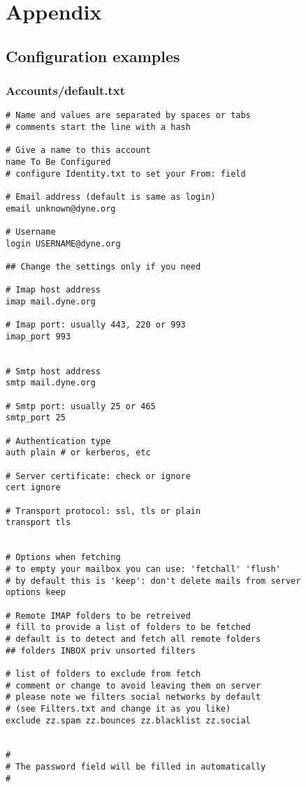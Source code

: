 \documentclass[a4,onecolumn,portrait]{article}
\begin{document}
\section{Appendix}
\label{sec-13}

\subsection{Configuration examples}
\label{sec-13-1}

\subsubsection{Accounts/default.txt}
\label{sec-13-1-1}

\begin{verbatim}
# Name and values are separated by spaces or tabs
# comments start the line with a hash

# Give a name to this account
name To Be Configured
# configure Identity.txt to set your From: field

# Email address (default is same as login)
email unknown@dyne.org

# Username
login USERNAME@dyne.org

## Change the settings only if you need

# Imap host address
imap mail.dyne.org

# Imap port: usually 443, 220 or 993
imap_port 993


# Smtp host address
smtp mail.dyne.org

# Smtp port: usually 25 or 465
smtp_port 25

# Authentication type
auth plain # or kerberos, etc

# Server certificate: check or ignore
cert ignore

# Transport protocol: ssl, tls or plain
transport tls


# Options when fetching
# to empty your mailbox you can use: 'fetchall' 'flush'
# by default this is 'keep': don't delete mails from server
options keep

# Remote IMAP folders to be retreived
# fill to provide a list of folders to be fetched
# default is to detect and fetch all remote folders
## folders INBOX priv unsorted filters 

# list of folders to exclude from fetch
# comment or change to avoid leaving them on server
# please note we filters social networks by default
# (see Filters.txt and change it as you like)
exclude zz.spam zz.bounces zz.blacklist zz.social


#
# The password field will be filled in automatically
#
\end{verbatim}
\end{document}

